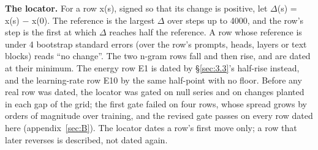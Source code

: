 \documentclass[11pt]{article}
\begin{document}
\textbf{The locator.} For a row x(s), signed so that its change is positive, let $\Delta $(s) = x(s) $-$ x(0). The reference is the largest $\Delta $ over steps up to 4000, and the row's step is the first at which $\Delta $ reaches half the reference. A row whose reference is under 4 bootstrap standard errors (over the row's prompts, heads, layers or text blocks) reads ``no change''. The two n-gram rows fall and then rise, and are dated at their minimum. The energy row E1 is dated by \S\ref{sec:3.3}'s half-rise instead, and the learning-rate row E10 by the same half-point with no floor. Before any real row was dated, the locator was gated on null series and on changes planted in each gap of the grid; the first gate failed on four rows, whose spread grows by orders of magnitude over training, and the revised gate passes on every row dated here (appendix~\ref{sec:B}). The locator dates a row's first move only; a row that later reverses is described, not dated again.
\end{document}
